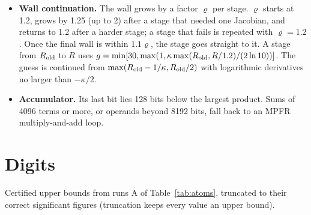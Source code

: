 \documentclass[aps,pra,reprint,superscriptaddress,amsmath,amssymb,longbibliography]{revtex4-2}
\begin{document}
\begin{itemize}
\item \textbf{Wall continuation.} The wall grows by a factor $\varrho$ per stage. $\varrho$ starts at 1.2, grows by 1.25 (up to 2) after a stage that needed one Jacobian, and returns to 1.2 after a harder stage; a stage that fails is repeated with $\varrho=1.2$. Once the final wall is within $1.1\varrho$, the stage goes straight to it. A stage from $R_{\rm old}$ to $R$ uses $g=\min[30,\max(1,\kappa\max(R_{\rm old},R/1.2)/(2\ln10))]$. The guess is continued from $\max(R_{\rm old}-1/\kappa,R_{\rm old}/2)$ with logarithmic derivatives no larger than $-\kappa/2$.
\item \textbf{Accumulator.} Its last bit lies 128 bits below the largest product. Sums of 4096 terms or more, or operands beyond 8192 bits, fall back to an MPFR multiply-and-add loop.
\end{itemize}

\section{Digits}\label{app:digits}

\begin{widetext}
Certified upper bounds from runs A of Table~\ref{tab:atoms}, truncated to their correct significant figures (truncation keeps every value an upper bound).\par\medskip

\end{widetext}
\end{document}
